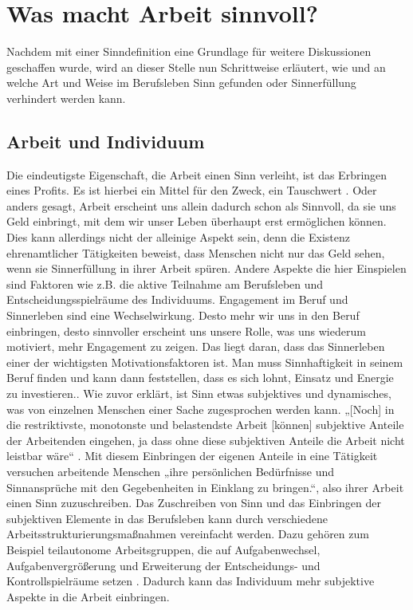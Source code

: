\chapter{Was macht Arbeit sinnvoll?}
Nachdem mit einer Sinndefinition eine Grundlage für weitere Diskussionen geschaffen wurde, wird an dieser Stelle nun Schrittweise erläutert, wie und an welche Art und Weise im Berufsleben Sinn gefunden oder Sinnerfüllung verhindert werden kann. 
\section{Arbeit und Individuum}
Die eindeutigste Eigenschaft, die Arbeit einen Sinn verleiht, ist das Erbringen eines Profits. Es ist hierbei ein Mittel für den Zweck, ein Tauschwert \cite[S.192-193]{Voswinkel.2018}. Oder anders gesagt, Arbeit erscheint uns allein dadurch schon als Sinnvoll, da sie uns Geld einbringt, mit dem wir unser Leben überhaupt erst ermöglichen können. Dies kann allerdings nicht der alleinige Aspekt sein, denn die Existenz ehrenamtlicher Tätigkeiten beweist, dass Menschen nicht nur das Geld sehen, wenn sie Sinnerfüllung in ihrer Arbeit spüren. 
Andere Aspekte die hier Einspielen sind Faktoren wie z.B. die aktive Teilnahme am Berufsleben und Entscheidungsspielräume des Individuums. Engagement im Beruf und Sinnerleben sind eine Wechselwirkung. Desto mehr wir uns in den Beruf einbringen, desto sinnvoller erscheint uns unsere Rolle, was uns wiederum motiviert, mehr Engagement zu zeigen. Das liegt daran, dass das Sinnerleben einer der wichtigsten Motivationsfaktoren ist. Man muss Sinnhaftigkeit in seinem Beruf finden und kann dann feststellen, dass es sich lohnt, Einsatz und Energie zu investieren.\cite[S.205-206]{FluterHoffmann.2018}. Wie zuvor erklärt, ist Sinn etwas subjektives und dynamisches, was von einzelnen Menschen einer Sache zugesprochen werden kann. „[Noch] in die restriktivste, monotonste und belastendste Arbeit [können] subjektive Anteile der Arbeitenden eingehen, ja dass ohne diese subjektiven Anteile die Arbeit nicht leistbar wäre“ \cite[S.79]{SenghaasKnobloch.2008}. Mit diesem Einbringen der eigenen Anteile in eine Tätigkeit versuchen arbeitende Menschen „ihre persönlichen Bedürfnisse und Sinnansprüche mit den Gegebenheiten in Einklang zu bringen.“, also ihrer Arbeit einen Sinn zuzuschreiben\cite[S.66]{Freier.2018}. Das Zuschreiben von Sinn und das Einbringen der subjektiven Elemente in das Berufsleben kann durch verschiedene Arbeitsstrukturierungsmaßnahmen vereinfacht werden. Dazu gehören zum Beispiel teilautonome Arbeitsgruppen, die auf Aufgabenwechsel, Aufgabenvergrößerung und Erweiterung der Entscheidungs- und Kontrollspielräume setzen \cite[S.67]{Freier.2018}. Dadurch kann das Individuum mehr subjektive Aspekte in die Arbeit einbringen.
